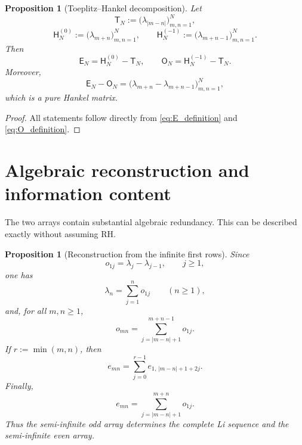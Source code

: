 \documentclass[11pt]{amsart}
\numberwithin{equation}{section}
\theoremstyle{plain}
\newtheorem{proposition}[theorem]{Proposition}
\theoremstyle{definition}
\theoremstyle{remark}
\newcommand{\RH}{\mathrm{RH}}
\newcommand{\E}{\mathsf E}
\newcommand{\Omat}{\mathsf O}
\begin{document}
\begin{proposition}[Toeplitz--Hankel decomposition]
\label{prop:toeplitz_hankel}
Let
\begin{equation}
\mathsf T_N:=\bigl(\lambda_{|m-n|}\bigr)_{m,n=1}^N,
\label{eq:T_definition}
\end{equation}
\begin{equation}
\mathsf H_N^{(0)}:=\bigl(\lambda_{m+n}\bigr)_{m,n=1}^N,
\qquad
\mathsf H_N^{(-1)}:=\bigl(\lambda_{m+n-1}\bigr)_{m,n=1}^N.
\label{eq:H_definitions}
\end{equation}
Then
\begin{equation}
\E_N=\mathsf H_N^{(0)}-\mathsf T_N,
\qquad
\Omat_N=\mathsf H_N^{(-1)}-\mathsf T_N.
\label{eq:toeplitz_hankel_decomposition}
\end{equation}
Moreover,
\begin{equation}
\E_N-\Omat_N
=\bigl(\lambda_{m+n}-\lambda_{m+n-1}\bigr)_{m,n=1}^N,
\label{eq:E_minus_O}
\end{equation}
which is a pure Hankel matrix.
\end{proposition}

\begin{proof}
All statements follow directly from \eqref{eq:E_definition} and \eqref{eq:O_definition}.
\end{proof}

\section{Algebraic reconstruction and information content}
\label{sec:algebraic_reconstruction}

The two arrays contain substantial algebraic redundancy.  This can be described exactly without assuming $\RH$.

\begin{proposition}[Reconstruction from the infinite first rows]
\label{prop:first_row_reconstruction}
Since
\begin{equation}
o_{1j}=\lambda_j-\lambda_{j-1},
\qquad j\ge1,
\label{eq:odd_first_row_differences}
\end{equation}
one has
\begin{equation}
\lambda_n=\sum_{j=1}^{n}o_{1j}
\qquad(n\ge1),
\label{eq:lambda_from_O_first_row}
\end{equation}
and, for all $m,n\ge1$,
\begin{equation}
o_{mn}
=\sum_{j=|m-n|+1}^{m+n-1}o_{1j}.
\label{eq:O_interval_sum_reconstruction}
\end{equation}
If $r:=\min(m,n)$, then
\begin{equation}
e_{mn}
=\sum_{j=0}^{r-1}
e_{1,\,|m-n|+1+2j}.
\label{eq:E_step_two_reconstruction}
\end{equation}
Finally,
\begin{equation}
e_{mn}
=\sum_{j=|m-n|+1}^{m+n}o_{1j}.
\label{eq:E_from_O_first_row}
\end{equation}
Thus the semi-infinite odd array determines the complete Li sequence and the semi-infinite even array.
\end{proposition}
\end{document}

